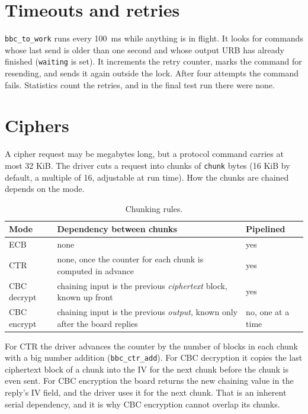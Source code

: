 \documentclass[11pt,a4paper,oneside]{report}
\newcommand{\code}[1]{\texttt{\small #1}}
\begin{document}
\section{Timeouts and retries}

\code{bbc\_to\_work} runs every 100~ms while anything is in flight. It looks for commands whose last send is older than one second and whose output URB has already finished (\code{waiting} is set). It increments the retry counter, marks the command for resending, and sends it again outside the lock. After four attempts the command fails. Statistics count the retries, and in the final test run there were none.

\section{Ciphers}

A cipher request may be megabytes long, but a protocol command carries at most 32 KiB. The driver cuts a request into chunks of \code{chunk} bytes (16 KiB by default, a multiple of 16, adjustable at run time). How the chunks are chained depends on the mode.

\begin{table}[ht]
\centering
\begin{tabularx}{\textwidth}{lXl}
\toprule
Mode & Dependency between chunks & Pipelined \\
\midrule
ECB & none & yes \\
CTR & none, once the counter for each chunk is computed in advance & yes \\
CBC decrypt & chaining input is the previous \emph{ciphertext} block, known up front & yes \\
CBC encrypt & chaining input is the previous \emph{output}, known only after the board replies & no, one at a time \\
\bottomrule
\end{tabularx}
\caption{Chunking rules.}
\end{table}

For CTR the driver advances the counter by the number of blocks in each chunk with a big number addition (\code{bbc\_ctr\_add}). For CBC decryption it copies the last ciphertext block of a chunk into the IV for the next chunk before the chunk is even sent. For CBC encryption the board returns the new chaining value in the reply's IV field, and the driver uses it for the next chunk. That is an inherent serial dependency, and it is why CBC encryption cannot overlap its chunks.
\end{document}

